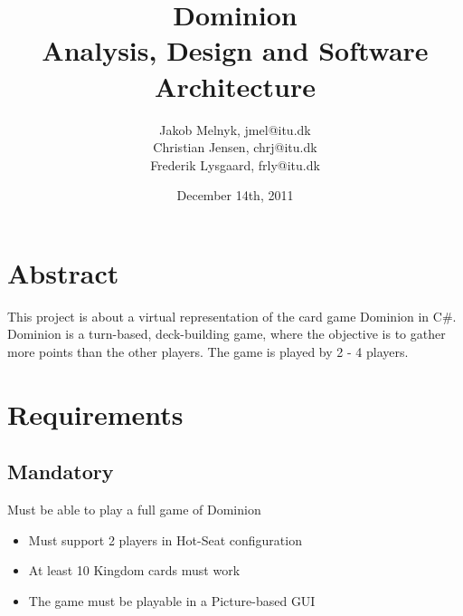 \documentclass[12pt,a4paper,notitlepage]{article}
\title{\huge{Dominion}\\
\large{Analysis, Design and Software Architecture}
}
\author{
Jakob Melnyk, jmel@itu.dk\\
Christian Jensen, chrj@itu.dk\\
Frederik Lysgaard, frly@itu.dk
}
\date{December 14th, 2011}
\begin{document}
\maketitle
\vfill
\section*{Abstract}
This project is about a virtual representation of the card game Dominion in C\#. Dominion is a turn-based, deck-building game, where the objective is to gather more points than the other players. The game is played by 2 - 4 players.
\clearpage
\tableofcontents
\pagebreak
\section{Requirements}
\subsection{Mandatory}
Must be able to play a full game of Dominion
\begin{itemize}
\item Must support 2 players in Hot-Seat configuration
\item At least 10 Kingdom cards must work
\item The game must be playable in a Picture-based GUI
\end{itemize}
\end{document}
